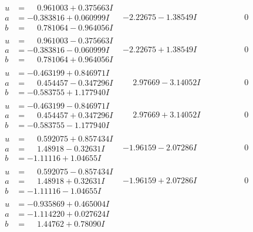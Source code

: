 \documentclass[1p]{elsarticle_modified}
\theoremstyle{definition}
\begin{document}
$$\begin{array}{c|c|c}
\begin{aligned}
u &= \phantom{-}0.961003 + 0.375663 I \\
a &= -0.383816 + 0.060999 I \\
b &= \phantom{-}0.781064 - 0.964056 I\end{aligned}
 & -2.22675 - 1.38549 I & \phantom{-0.000000 } 0 \\ \hline\begin{aligned}
u &= \phantom{-}0.961003 - 0.375663 I \\
a &= -0.383816 - 0.060999 I \\
b &= \phantom{-}0.781064 + 0.964056 I\end{aligned}
 & -2.22675 + 1.38549 I & \phantom{-0.000000 } 0 \\ \hline\begin{aligned}
u &= -0.463199 + 0.846971 I \\
a &= \phantom{-}0.454457 - 0.347296 I \\
b &= -0.583755 + 1.177940 I\end{aligned}
 & \phantom{-}2.97669 - 3.14052 I & \phantom{-0.000000 } 0 \\ \hline\begin{aligned}
u &= -0.463199 - 0.846971 I \\
a &= \phantom{-}0.454457 + 0.347296 I \\
b &= -0.583755 - 1.177940 I\end{aligned}
 & \phantom{-}2.97669 + 3.14052 I & \phantom{-0.000000 } 0 \\ \hline\begin{aligned}
u &= \phantom{-}0.592075 + 0.857434 I \\
a &= \phantom{-}1.48918 - 0.32631 I \\
b &= -1.11116 + 1.04655 I\end{aligned}
 & -1.96159 - 2.07286 I & \phantom{-0.000000 } 0 \\ \hline\begin{aligned}
u &= \phantom{-}0.592075 - 0.857434 I \\
a &= \phantom{-}1.48918 + 0.32631 I \\
b &= -1.11116 - 1.04655 I\end{aligned}
 & -1.96159 + 2.07286 I & \phantom{-0.000000 } 0 \\ \hline\begin{aligned}
u &= -0.935869 + 0.465004 I \\
a &= -1.114220 + 0.027624 I \\
b &= \phantom{-}1.44762 + 0.78090 I\end{aligned}

\end{array}$$
\end{document}
